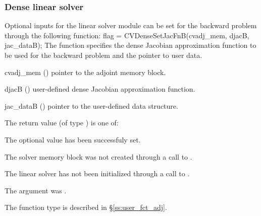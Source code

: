 \subsubsection{Dense linear solver}
Optional inputs for the {\cvdense} linear solver module can be set for the backward
problem through the following function:
{
  flag = CVDenseSetJacFnB(cvadj\_mem, djacB, jac\_dataB);
}
{
  The function  specifies the dense Jacobian
  approximation function to be used for the backward problem and the
  pointer to user data.
}
{
  \begin{args}
  \item[cvadj\_mem] ()
    pointer to the adjoint memory block.
  \item[djacB] ()
    user-defined dense Jacobian approximation function.
  \item[jac\_dataB] ()
    pointer to the user-defined data structure.
  \end{args}
}
{
  The return value  (of type ) is one of:
  \begin{args}
  \item[\Id{CVDENSE\_SUCCESS}] 
    The optional value has been successfuly set.
  \item[\Id{CVDENSE\_MEM\_NULL}]
    The {\cvodes} solver memory block was not created through a call to .
  \item[\Id{CVDENSE\_LMEM\_NULL}]
    The {\cvdense} linear solver has not been initialized through a call to .
  \item[\Id{CVDENSE\_ADJMEM\_NULL}]
    The  argument was .
  \end{args}
}
{
  The function type  is described in \S\ref{ss:user_fct_adj}.
}


